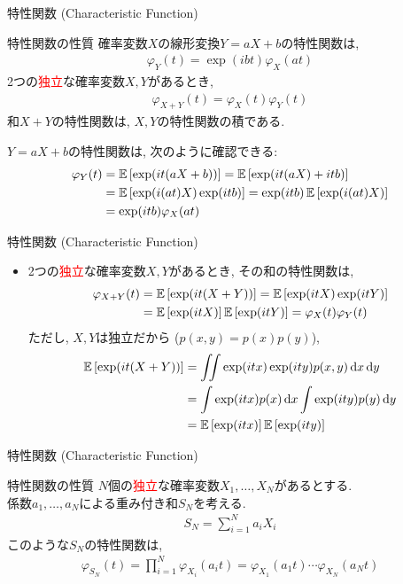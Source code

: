\documentclass[dvipdfmx,notheorems,t]{beamer}
\begin{document}
\begin{frame}{特性関数 (Characteristic Function)}
\begin{block}{特性関数の性質}
  確率変数$X$の線形変換$Y = aX + b$の特性関数は,
  \begin{align*}
    \varphi_Y(t) = \exp(ibt) \varphi_X(at)
  \end{align*}
  2つの\textcolor{red}{独立}な確率変数$X, Y$があるとき,
  \begin{align*}
    \varphi_{X + Y}(t) = \varphi_X(t) \varphi_Y(t)
  \end{align*}
  和$X + Y$の特性関数は, $X, Y$の特性関数の積である.
\end{block}

$Y = aX + b$の特性関数は, 次のように確認できる:
\begin{align*}
  \varphi_Y(t) &= \operatorname{\mathbb{E}} \left[ \exp(it (aX + b)) \right]
    = \operatorname{\mathbb{E}} \left[ \exp(it (aX) + itb) \right] \\
    &= \operatorname{\mathbb{E}} \left[ \exp(i (at) X) \exp(itb) \right]
    = \exp(itb) \operatorname{\mathbb{E}} \left[ \exp(i (at) X) \right] \\
    &= \exp(itb) \varphi_X(at)
\end{align*}
\end{frame}

\begin{frame}{特性関数 (Characteristic Function)}
\begin{itemize}
  \item 2つの\textcolor{red}{独立}な確率変数$X, Y$があるとき, その和の特性関数は,
  \begin{align*}
    \varphi_{X + Y}(t) &= \operatorname{\mathbb{E}} \left[ \exp(it (X + Y)) \right]
      = \operatorname{\mathbb{E}} \left[ \exp(itX) \exp(itY) \right] \\
      &= \operatorname{\mathbb{E}} \left[ \exp(itX) \right] \operatorname{\mathbb{E}} \left[ \exp(itY) \right] = \varphi_X(t) \varphi_Y(t)
  \end{align*}
  ただし, $X, Y$は独立だから ($p(x, y) = p(x) p(y)$),
  \begin{align*}
    \operatorname{\mathbb{E}} \left[ \exp(it (X + Y)) \right] &= \iint \exp(itx) \exp(ity) p(x, y) \dd{x} \dd{y} \\
      &= \int \exp(itx) p(x) \dd{x} \int \exp(ity) p(y) \dd{y} \\
      &= \operatorname{\mathbb{E}} \left[ \exp(itx) \right] \operatorname{\mathbb{E}} \left[ \exp(ity) \right]
  \end{align*}
\end{itemize}
\end{frame}

\begin{frame}{特性関数 (Characteristic Function)}
\begin{block}{特性関数の性質}
  $N$個の\textcolor{red}{独立}な確率変数$X_1, \ldots, X_N$があるとする. \\
  係数$a_1, \ldots, a_N$による重み付き和$S_N$を考える.
  \begin{align*}
    S_N = \sum_{i = 1}^N a_i X_i
  \end{align*}
  このような$S_N$の特性関数は,
  \begin{align*}
    \varphi_{S_N}(t) = \prod_{i = 1}^N \varphi_{X_i}(a_i t)
      = \varphi_{X_1}(a_1 t) \cdots \varphi_{X_N}(a_N t)
  \end{align*}
\end{block}
\end{frame}
\end{document}
